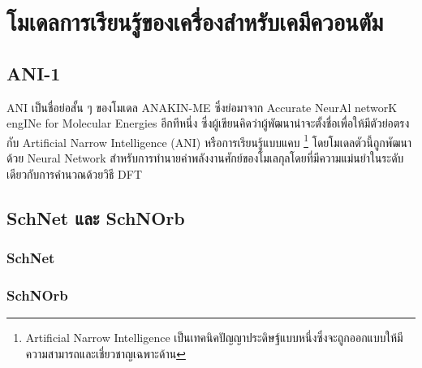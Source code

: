 

\chapter{โมเดลการเรียนรู้ของเครื่องสำหรับเคมีควอนตัม}
\label{ch:chem_ml}

\section{ANI-1}
\label{sec:ani1}

ANI เป็นชื่อย่อสั้น ๆ ของโมเดล ANAKIN-ME ซึ่งย่อมาจาก Accurate NeurAl networK engINe for Molecular Energies อีกทีหนึ่ง 
ซึ่งผู้เขียนคิดว่าผู้พัฒนาน่าจะตั้งชื่อเพื่อให้มีตัวย่อตรงกับ Artificial Narrow Intelligence (ANI) หรือการเรียนรู้แบบแคบ%
\footnote{Artificial Narrow Intelligence เป็นเทคนิคปัญญาประดิษฐ์แบบหนึ่งซึ่งจะถูกออกแบบให้มีความสามารถและเชี่ยวชาญเฉพาะด้าน}
โดยโมเดลตัวนี้ถูกพัฒนาด้วย Neural Network สำหรับการทำนายค่าพลังงานศักย์ของโมเลกุลโดยที่มีความแม่นยำในระดับเดียวกับการคำนวณด้วยวิธี 
DFT\autocite{smith2017}

\section{SchNet และ SchNOrb}
\label{sec:schnet_schnorb}

\subsection{SchNet}
\label{ssec:schnet}

\autocite{schutt2017,schutt2018}

\subsection{SchNOrb}
\label{ssec:schnorb}

